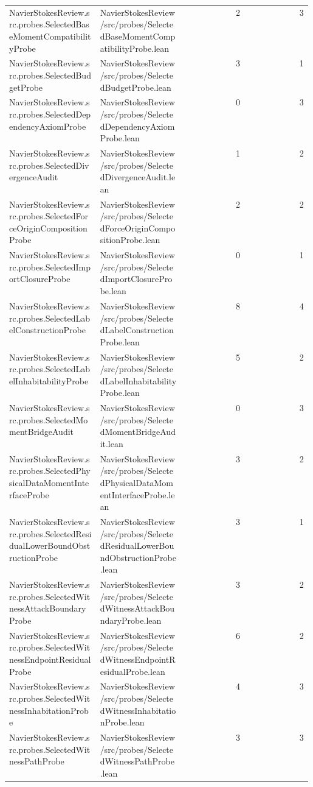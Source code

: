 \begin{longtable}{p{0.30\linewidth}p{0.28\linewidth}rr}
NavierStokesReview.src.probes.SelectedBaseMomentCompatibilityProbe & NavierStokesReview/src/probes/SelectedBaseMomentCompatibilityProbe.lean & 2 & 3\\
NavierStokesReview.src.probes.SelectedBudgetProbe & NavierStokesReview/src/probes/SelectedBudgetProbe.lean & 3 & 1\\
NavierStokesReview.src.probes.SelectedDependencyAxiomProbe & NavierStokesReview/src/probes/SelectedDependencyAxiomProbe.lean & 0 & 3\\
NavierStokesReview.src.probes.SelectedDivergenceAudit & NavierStokesReview/src/probes/SelectedDivergenceAudit.lean & 1 & 2\\
NavierStokesReview.src.probes.SelectedForceOriginCompositionProbe & NavierStokesReview/src/probes/SelectedForceOriginCompositionProbe.lean & 2 & 2\\
NavierStokesReview.src.probes.SelectedImportClosureProbe & NavierStokesReview/src/probes/SelectedImportClosureProbe.lean & 0 & 1\\
NavierStokesReview.src.probes.SelectedLabelConstructionProbe & NavierStokesReview/src/probes/SelectedLabelConstructionProbe.lean & 8 & 4\\
NavierStokesReview.src.probes.SelectedLabelInhabitabilityProbe & NavierStokesReview/src/probes/SelectedLabelInhabitabilityProbe.lean & 5 & 2\\
NavierStokesReview.src.probes.SelectedMomentBridgeAudit & NavierStokesReview/src/probes/SelectedMomentBridgeAudit.lean & 0 & 3\\
NavierStokesReview.src.probes.SelectedPhysicalDataMomentInterfaceProbe & NavierStokesReview/src/probes/SelectedPhysicalDataMomentInterfaceProbe.lean & 3 & 2\\
NavierStokesReview.src.probes.SelectedResidualLowerBoundObstructionProbe & NavierStokesReview/src/probes/SelectedResidualLowerBoundObstructionProbe.lean & 3 & 1\\
NavierStokesReview.src.probes.SelectedWitnessAttackBoundaryProbe & NavierStokesReview/src/probes/SelectedWitnessAttackBoundaryProbe.lean & 3 & 2\\
NavierStokesReview.src.probes.SelectedWitnessEndpointResidualProbe & NavierStokesReview/src/probes/SelectedWitnessEndpointResidualProbe.lean & 6 & 2\\
NavierStokesReview.src.probes.SelectedWitnessInhabitationProbe & NavierStokesReview/src/probes/SelectedWitnessInhabitationProbe.lean & 4 & 3\\
NavierStokesReview.src.probes.SelectedWitnessPathProbe & NavierStokesReview/src/probes/SelectedWitnessPathProbe.lean & 3 & 3\\

\end{longtable}
